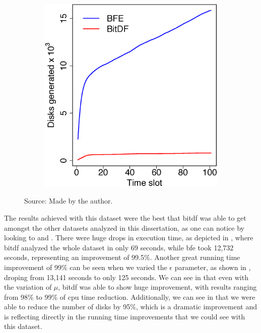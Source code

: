 {\begin{figure}[h!]
\begin{subfigure}[t]{0.48\textwidth}
        \includegraphics[width=\textwidth]{images/Brinkhoff_d.eps}
        \label{fig:brinkhoff_disks}
    \end{subfigure}
    \footnotesize{Source: Made by the author.}
    \label{fig:brinkhoff_results2}
\end{figure}

The results achieved with this dataset were the best that \ac{bitdf} was able to get amongst the other datasets analyzed
in this dissertation, as one can notice by looking to  and
. There were huge drops in execution time, as depicted in ,
where \ac{bitdf} analyzed the whole dataset in only 69 seconds, while \ac{bfe} took 12,732 seconds, representing an
improvement of 99.5\%. Another great running time improvement of 99\% can be seen when we varied the $\epsilon$
parameter, as shown in , droping from 13,141 seconds to only 125 seconds. We can see in
 that even with the variation of $\mu$, \ac{bitdf} was able to show huge improvement, with
results ranging from 98\% to 99\% of \ac{cpu} time reduction. Additionally, we can see in 
that we were able to reduce the number of disks by 95\%, which is a dramatic improvement and is reflecting directly in
the running time improvements that we could see with this dataset.

}
